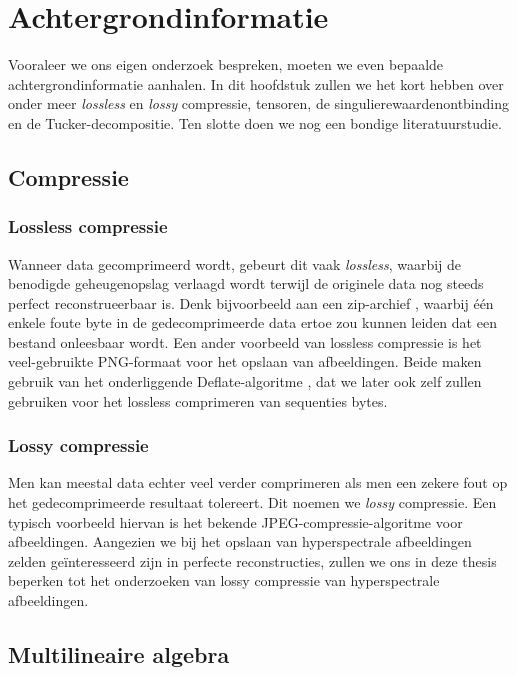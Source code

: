\chapter{Achtergrondinformatie}
\label{hoofdstuk:achtergrond}

Vooraleer we ons eigen onderzoek bespreken, moeten we even bepaalde achtergrondinformatie aanhalen. In dit hoofdstuk zullen we het kort hebben over onder meer \textit{lossless} en \textit{lossy} compressie, tensoren, de singulierewaardenontbinding en de Tucker-decompositie. Ten slotte doen we nog een bondige literatuurstudie.

\section{Compressie}

\subsection{Lossless compressie}

Wanneer data gecomprimeerd wordt, gebeurt dit vaak \textit{lossless}, waarbij de benodigde geheugenopslag verlaagd wordt terwijl de originele data nog steeds perfect reconstrueerbaar is. Denk bijvoorbeeld aan een zip-archief \cite{ref:zip}, waarbij \'e\'en enkele foute byte in de gedecomprimeerde data ertoe zou kunnen leiden dat een bestand onleesbaar wordt. Een ander voorbeeld van lossless compressie is het veel-gebruikte PNG-formaat \cite{ref:png} voor het opslaan van afbeeldingen. Beide maken gebruik van het onderliggende Deflate-algoritme \cite{ref:deflate}, dat we later ook zelf zullen gebruiken voor het lossless comprimeren van sequenties bytes.

\subsection{Lossy compressie}

Men kan meestal data echter veel verder comprimeren als men een zekere fout op het gedecomprimeerde resultaat tolereert. Dit noemen we \textit{lossy} compressie. Een typisch voorbeeld hiervan is het bekende JPEG-compressie-algoritme \cite{ref:jpeg} voor afbeeldingen. Aangezien we bij het opslaan van hyperspectrale afbeeldingen zelden ge\"interesseerd zijn in perfecte reconstructies, zullen we ons in deze thesis beperken tot het onderzoeken van lossy compressie van hyperspectrale afbeeldingen.

\newpage
\section{Multilineaire algebra}

